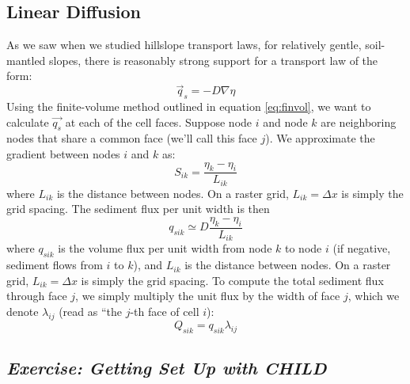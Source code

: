 \documentclass[12pt,reqno]{amsart}
\begin{document}
\subsection{Linear Diffusion}

As we saw when we studied hillslope transport laws, for relatively gentle, soil-mantled slopes, there is reasonably strong support for a transport law of the form:
\begin{equation}
\vec{q}_s = -D \nabla \eta
\end{equation}
Using the finite-volume method outlined in equation \ref{eq:finvol}, we want to calculate $\vec{q_s}$ at each of the cell faces. Suppose node $i$ and node $k$ are neighboring nodes that share a common face (we'll call this face $j$). We approximate the gradient between nodes $i$ and $k$ as:
\begin{equation}
S_{ik} = \frac{\eta_k - \eta_i}{L_{ik}}
\end{equation}
where $L_{ik}$ is the distance between nodes. On a raster grid, $L_{ik} = \Delta x$ is simply the grid spacing. The sediment flux per unit width is then
\begin{equation}
q_{sik} \simeq D \frac{\eta_k - \eta_i}{L_{ik}}
\end{equation} 
where $q_{sik}$ is the volume flux per unit width from node $k$ to node $i$ (if negative, sediment flows from $i$ to $k$), and $L_{ik}$ is the distance between nodes. On a raster grid, $L_{ik} = \Delta x$ is simply the grid spacing. To compute the total sediment flux through face $j$, we simply multiply the unit flux by the width of face $j$, which we denote $\lambda_{ij}$ (read as ``the $j$-th face of cell $i$):
\begin{equation}
Q_{sik} = q_{sik} \lambda_{ij}
\end{equation}

\subsection*{\em Exercise: Getting Set Up with CHILD}
\end{document}
